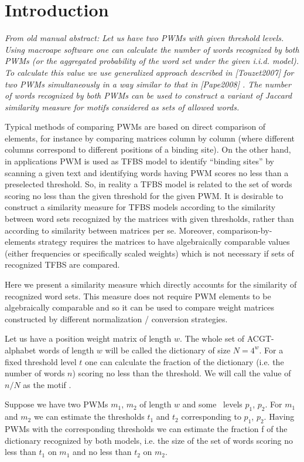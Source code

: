 \section{Introduction}
\emph{From old manual abstract: Let us have two PWMs with given threshold levels. Using macroape software one can 
calculate the number of words recognized by both PWMs (or the aggregated probability of the 
word set under the given i.i.d. model). To calculate this value we use generalized approach 
described in [Touzet2007] for two PWMs simultaneously in a way similar to that in [Pape2008]
. The number of words recognized by both PWMs can be used to construct a variant of Jaccard 
similarity measure for motifs considered as sets of allowed words.}

Typical methods of comparing PWMs are based on direct comparison of elements, for instance 
by comparing matrices column by column (where different columns correspond to different 
positions of a binding site). On the other hand, in applications PWM is used as TFBS model 
to identify “binding sites” by scanning a given text and identifying words having PWM scores 
no less than a preselected threshold. So, in reality a TFBS model is related to the set of words 
scoring no less than the given threshold for the given PWM. It is desirable to construct a 
similarity measure for TFBS models according to the similarity between word sets recognized 
by the matrices with given thresholds, rather than according to similarity between matrices per 
se. Moreover, comparison-by-elements strategy requires the matrices to have algebraically 
comparable values (either frequencies or specifically scaled weights) which is not necessary if 
sets of recognized TFBS are compared.

Here we present a similarity measure which directly accounts for the similarity of 
recognized word sets. This measure does not require PWM elements to be algebraically 
comparable and so it can be used to compare weight matrices constructed by different 
normalization / conversion strategies.

Let us have a position weight matrix of length $w$. The whole set of ACGT-alphabet 
words of length $w$ will be called the dictionary of size $N=4^w$. For a fixed threshold level $t$ one 
can calculate the fraction of the dictionary (i.e. the number of words $n$) scoring no less than the 
threshold. We will call the value of $n / N$ as the motif \pvalue.

Suppose we have two PWMs $m_1$, $m_2$ of length $w$ and some \pvalue\ levels $p_1$, $p_2$. For $m_1$
and $m_2$ we can estimate the thresholds $t_1$ and $t_2$ corresponding to $p_1$, $p_2$. Having PWMs with the 
corresponding thresholds we can estimate the fraction f of the dictionary recognized by both 
models, i.e. the size of the set of words scoring no less than $t_1$ on $m_1$ and no less than $t_2$ on $m_2$.

